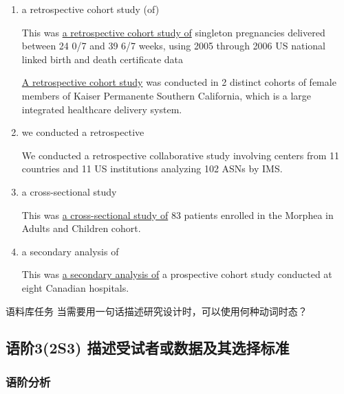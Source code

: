\documentclass[a4paper]{ctexbook}
\begin{document}
    \begin{enumerate}
      \item a retrospective cohort study (of)
      \begin{eg}{}
        This was \uline{a retrospective cohort study of} singleton pregnancies delivered between 24 0/7 and 39 6/7 weeks, using 2005 through 2006 US national linked birth and death certificate data
      \end{eg}
      
      \begin{eg}{}
        \uline{A retrospective cohort study} was conducted in 2 distinct cohorts of female members of Kaiser Permanente Southern California, which is a large integrated healthcare delivery system.
      \end{eg}

      \item we conducted a retrospective
      \begin{eg}{}
        We conducted a retrospective collaborative study involving centers from 11 countries and 11 US institutions analyzing 102 ASNs by IMS.
      \end{eg}

      \item a cross-sectional study
      \begin{eg}{}
        This was \uline{a cross-sectional study of} 83 patients enrolled in the Morphea in Adults and Children cohort.
      \end{eg}

      \item a secondary analysis of
      \begin{eg}{}
        This was \uline{a secondary analysis of} a prospective cohort study conducted at eight Canadian hospitals.
      \end{eg}
    \end{enumerate}

    \begin{task}{\heiti 语料库任务}
      当需要用一句话描述研究设计时，可以使用何种动词时态？
    \end{task}

  \subsection{语阶3(2S3) 描述受试者或数据及其选择标准}

    \subsubsection{语阶分析}
\end{document}
